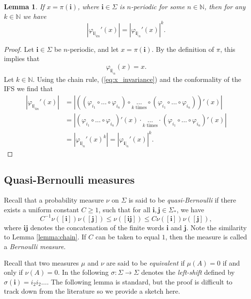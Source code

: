 \documentclass{PRM}
\newcommand{\field}[1]{\mathbb{#1}}
\newcommand{\N}{\field{N}}
\newcommand{\iii}{\mathbf{i}}
\theoremstyle{plain}
\newtheorem{lemma}[thm]{Lemma}
\theoremstyle{definition}
\theoremstyle{remark}
\begin{document}
\begin{lemma}\label{lemma:power_equality}
If $x= \pi(\mathbf{i})$, where $\mathbf{i}\in\Sigma$ is $n$-periodic for some $n\in\N$, then for any $k\in\N$ we have
\begin{equation*}
    |\varphi_{\mathbf{i}|_{kn}}'(x)|=|\varphi_{\mathbf{i}|_{n}}'(x)|^k.
\end{equation*}
\end{lemma}
\begin{proof}
Let $\mathbf{i}\in \Sigma$ be $n$-periodic, and let $x=\pi(\mathbf{i})$. By the definition of $\pi$, this implies that 
\begin{equation}\label{eq:x_invariance}
    \varphi_{\mathbf{i}|_n}(x)=x.
\end{equation}
Let $k\in\N$. Using the chain rule, (\ref{eq:x_invariance}) and the conformality of the IFS we find that
\begin{align*}
    |\varphi_{\mathbf{i}|_{kn}}'(x)|&=|((\varphi_{i_1}\circ\ldots\circ\varphi_{i_n})\circ\underset{k\text{ times}}{\ldots}\circ(\varphi_{i_1}\circ\ldots\circ\varphi_{i_n}))'(x)|\\
    &=|(\varphi_{i_1}\circ\ldots\circ \varphi_{i_n})'(x)\cdot\underset{k\text{ times}}{\ldots}\cdot(\varphi_{i_1}\circ\ldots\circ \varphi_{i_n})'(x)|\\
    &=|\varphi_{\mathbf{i}|_n}'(x)^k|=|\varphi_{\mathbf{i}|_n}'(x)|^k.
\end{align*}
\end{proof}

\subsection{Quasi-Bernoulli measures}
Recall that a probability measure $\nu$ on $\Sigma$ is said to be \emph{quasi-Bernoulli} if there exists a uniform constant $C\geq 1$, such that for all $\mathbf{i},\mathbf{j}\in\Sigma_*$, we have
\begin{equation*}
    C^{-1}\nu([\mathbf{i}])\nu([\mathbf{j}])\leq \nu([\mathbf{i}\mathbf{j}])\leq C\nu([\mathbf{i}])\nu([\mathbf{j}]),
\end{equation*}
where $\mathbf{i}\mathbf{j}$ denotes the concatenation of the finite words $\mathbf{i}$ and $\mathbf{j}$. Note the similarity to Lemma \ref{lemma:chain}. If $C$ can be taken to equal $1$, then the measure is called a \emph{Bernoulli measure}.

Recall that two measures $\mu$ and $\nu$ are said to be \emph{equivalent} if $\mu(A)=0$ if and only if $\nu(A)=0$. In the following $\sigma\colon \Sigma\to\Sigma$ denotes the \emph{left-shift} defined by $\sigma(\iii)=i_2i_2\ldots$. The following lemma is standard, but the proof is difficult to track down from the literature so we provide a sketch here.
\end{document}
